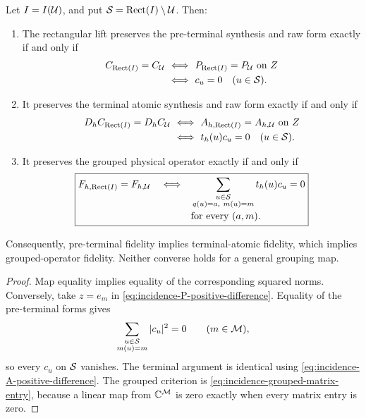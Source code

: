 \begin{theorem}
\label{thm:incidence-three-fidelity-criteria}
Let \(I=I(\mathcal U)\), and put
\(\mathcal S=\operatorname{Rect}(I)\setminus\mathcal U\).  Then:
\begin{enumerate}[label=\textup{(\roman*)},leftmargin=3em]
 \item The rectangular lift preserves the pre-terminal synthesis and raw
       form exactly if and only if
       \begin{equation}
        \begin{aligned}
        C_{\operatorname{Rect}(I)}=C_{\mathcal U}
        &\ \Longleftrightarrow\
        P_{\operatorname{Rect}(I)}=P_{\mathcal U}\text{ on }Z\\
        &\ \Longleftrightarrow\
        c_u=0\quad(u\in\mathcal S).
        \end{aligned}
        \label{eq:incidence-preterminal-iff}
       \end{equation}
 \item It preserves the terminal atomic synthesis and raw form exactly if
       and only if
       \begin{equation}
        \begin{aligned}
        D_hC_{\operatorname{Rect}(I)}=D_hC_{\mathcal U}
        &\ \Longleftrightarrow\
        A_{h,\operatorname{Rect}(I)}=A_{h,\mathcal U}\text{ on }Z\\
        &\ \Longleftrightarrow\
        t_h(u)c_u=0\quad(u\in\mathcal S).
        \end{aligned}
        \label{eq:incidence-terminal-iff}
       \end{equation}
 \item It preserves the grouped physical operator exactly if and only if
       \begin{equation}
        \boxed{
        \begin{aligned}
        F_{h,\operatorname{Rect}(I)}=F_{h,\mathcal U}
        \quad\Longleftrightarrow\quad&
        \sum_{\substack{u\in\mathcal S\\q(u)=a,\ m(u)=m}}t_h(u)c_u=0\\[-2pt]
        &\text{for every }(a,m).
        \end{aligned}}
        \label{eq:incidence-grouped-iff}
       \end{equation}
\end{enumerate}
Consequently, pre-terminal fidelity implies terminal-atomic fidelity,
which implies grouped-operator fidelity.  Neither converse holds for a
general grouping map.
\end{theorem}

\begin{proof}
Map equality implies equality of the corresponding squared norms.
Conversely, take \(z=e_m\) in
\eqref{eq:incidence-P-positive-difference}.  Equality of the pre-terminal
forms gives
\[
 \sum_{\substack{u\in\mathcal S\\m(u)=m}}|c_u|^2=0
 \qquad(m\in\mathcal M),
\]
so every \(c_u\) on \(\mathcal S\) vanishes.  The terminal argument is identical
using \eqref{eq:incidence-A-positive-difference}.  The grouped criterion
is \eqref{eq:incidence-grouped-matrix-entry}, because a linear map from
\(\mathbb C^{\mathcal M}\) is zero exactly when every matrix entry is zero.
\end{proof}

